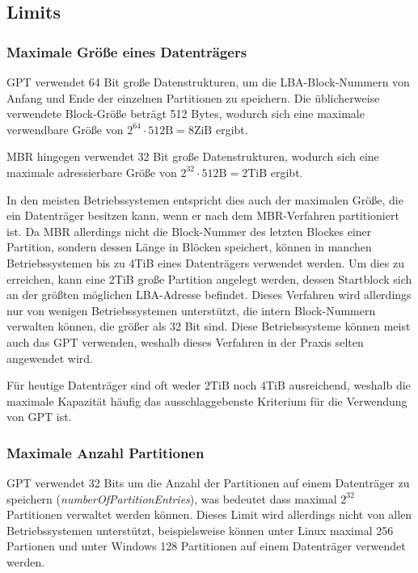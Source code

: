\subsection{Limits}

\subsubsection{Maximale Größe eines Datenträgers}
\label{sec:gpt:limits:max-partition-size}

GPT verwendet 64 Bit große Datenstrukturen, um die LBA-Block-Nummern von Anfang und Ende der einzelnen Partitionen zu speichern.
Die üblicherweise verwendete Block-Größe beträgt 512 Bytes, wodurch sich eine maximale verwendbare Größe von $ 2^{64} \cdot 512 \mathrm{B} = 8 \mathrm{ZiB} $ ergibt.

MBR hingegen verwendet 32 Bit große Datenstrukturen, wodurch sich eine maximale adressierbare Größe von $ 2^{32} \cdot 512 \mathrm{B} = 2 \mathrm{TiB} $ ergibt.

In den meisten Betriebssystemen entspricht dies auch der maximalen Größe, die ein Datenträger besitzen kann, wenn er nach dem MBR-Verfahren partitioniert ist.
Da MBR allerdings nicht die Block-Nummer des letzten Blockes einer Partition, sondern dessen Länge in Blöcken speichert, können in manchen Betriebssystemen bis zu 4TiB eines Datenträgers verwendet werden. 
Um dies zu erreichen, kann eine 2TiB große Partition angelegt werden, dessen Startblock sich an der größten möglichen LBA-Adresse befindet.
Dieses Verfahren wird allerdings nur von wenigen Betriebssystemen unterstützt, die intern Block-Nummern verwalten können, die größer als 32 Bit sind.
Diese Betriebssysteme können meist auch das GPT verwenden, weshalb dieses Verfahren in der Praxis selten angewendet wird.\cite{mbr-4tb-workaround}

Für heutige Datenträger sind oft weder 2TiB noch 4TiB ausreichend, weshalb die maximale Kapazität häufig das ausschlaggebenste Kriterium für die Verwendung von GPT ist.

\subsubsection{Maximale Anzahl Partitionen}
\label{sec:gpt:limits:max-partition-count}

GPT verwendet 32 Bits um die Anzahl der Partitionen auf einem Datenträger zu speichern (\textit{numberOfPartitionEntries}), was bedeutet dass maximal $ 2^{32} $ Partitionen verwaltet werden können.
Dieses Limit wird allerdings nicht von allen Betriebssystemen unterstützt, beispielsweise können unter Linux maximal 256 Partionen und unter Windows 128 Partitionen auf einem Datenträger verwendet werden.

